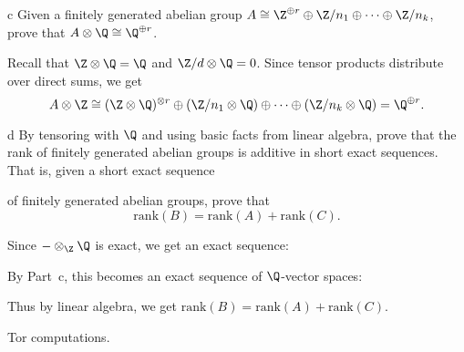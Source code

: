 \documentclass[11pt,letterpaper]{article}
\begin{document}
\begin{solution}
    \begin{partproblem}{c}
        Given a finitely generated abelian group $A\cong \Z^{\oplus r} \oplus \Z /n_1 \oplus \cdots \oplus\Z /n_k$, prove that $A\otimes \Q \cong \Q^{\oplus r}$. 
    \end{partproblem}
    \quad Recall that $\Z\otimes \Q = \Q$ and $\Z / d\otimes \Q = 0$. Since tensor products distribute over direct sums, we get
    \[
        A\otimes \Z \cong (\Z\otimes \Q)^{\otimes r} \oplus (\Z / n_1\otimes \Q)\oplus\cdots\oplus (\Z / n_k\otimes \Q) = \Q^{\oplus r}
    .\]  

    \begin{partproblem}{d}
        By tensoring with $\Q$ and using basic facts from linear algebra, prove that the rank of finitely generated abelian groups is additive in short exact sequences. That is, given a short exact sequence
        \begin{center}
        \end{center}
        of finitely generated abelian groups, prove that
        \[
            \text{rank}(B) = \text{rank}(A) + \text{rank}(C)
        .\] 
    \end{partproblem}
    \quad Since $-\otimes_\Z \Q$ is exact, we get an exact sequence:
    \begin{center}
    \end{center}
    By Part~c, this becomes an exact sequence of $\Q$-vector spaces:
    \begin{center}
    \end{center}
    Thus by linear algebra, we get $\text{rank}(B) = \text{rank}(A) + \text{rank}(C)$.
\end{solution}

\begin{problem}
    Tor computations.
\end{problem}
\end{document}
